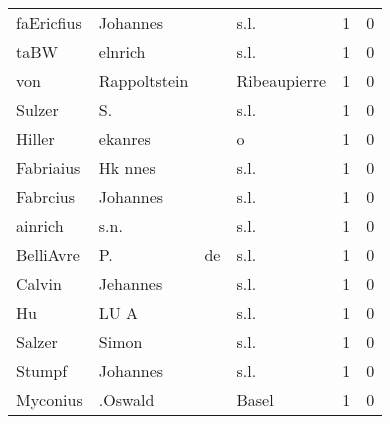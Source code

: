 \begin{tabular}{llllrr}
               faEricfius &                           Johannes &             &                                        s.l. &          1 &         0 \\
                     taBW &                            elnrich &             &                                        s.l. &          1 &         0 \\
                      von &                       Rappoltstein &             &                                Ribeaupierre &          1 &         0 \\
                   Sulzer &                                 S. &             &                                        s.l. &          1 &         0 \\
                   Hiller &                            ekanres &             &                                           o &          1 &         0 \\
                Fabriaius &                            Hk nnes &             &                                        s.l. &          1 &         0 \\
                 Fabrcius &                           Johannes &             &                                        s.l. &          1 &         0 \\
                  ainrich &                               s.n. &             &                                        s.l. &          1 &         0 \\
                BelliAvre &                                 P. &          de &                                        s.l. &          1 &         0 \\
                   Calvin &                           Jehannes &             &                                        s.l. &          1 &         0 \\
                       Hu &                               LU A &             &                                        s.l. &          1 &         0 \\
                   Salzer &                              Simon &             &                                        s.l. &          1 &         0 \\
                   Stumpf &                           Johannes &             &                                        s.l. &          1 &         0 \\
                 Myconius &                            .Oswald &             &                                       Basel &          1 &         0 \\

\end{tabular}
